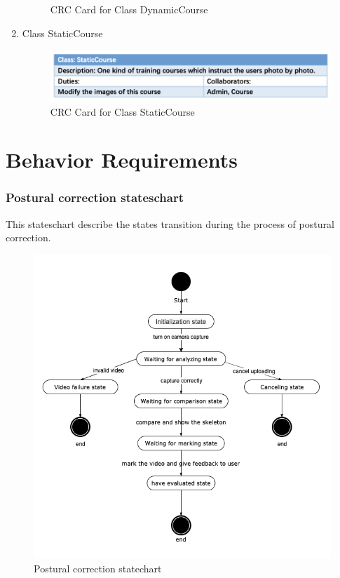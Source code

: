 \documentclass[16pt]{scrreprt}
\begin{document}
\begin{enumerate}
\begin{figure}[H]
			\caption{CRC Card for Class DynamicCourse}
			\label{fig:dynamic}
		\end{figure}
	\item Class StaticCourse
		\begin{figure}[H]
			\centering
			\includegraphics[width=1.1\textwidth]{figures/static.png}
			\caption{CRC Card for Class StaticCourse}
			\label{fig:static}
		\end{figure}
\end{enumerate}
\section{Behavior Requirements}

\subsubsection{Postural correction stateschart}

This stateschart describe the states transition during the process of postural correction.

\begin{figure}[H]
	\centering
	\includegraphics[width=1.0\textwidth]{figures/stateschart1.png}
	\caption{Postural correction statechart}
\end{figure}
\end{document}
